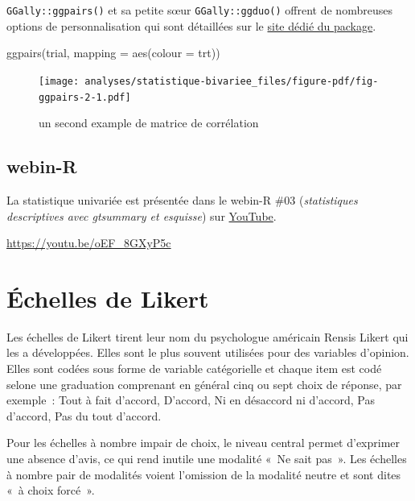 \documentclass[
  letterpaper,
  DIV=11,
  numbers=noendperiod,
  oneside]{scrreprt}
\newenvironment{Shaded}{\begin{snugshade}}{\end{snugshade}}
\newcommand{\AttributeTok}[1]{\textcolor[rgb]{0.40,0.45,0.13}{#1}}
\newcommand{\FunctionTok}[1]{\textcolor[rgb]{0.28,0.35,0.67}{#1}}
\newcommand{\NormalTok}[1]{\textcolor[rgb]{0.00,0.23,0.31}{#1}}
\begin{document}
\texttt{GGally::ggpairs()} et sa petite sœur \texttt{GGally::ggduo()}
offrent de nombreuses options de personnalisation qui sont détaillées
sur le \href{https://ggobi.github.io/ggally/articles/ggpairs.html}{site
dédié du package}.

\begin{Shaded}
\begin{Highlighting}[]
\FunctionTok{ggpairs}\NormalTok{(trial, }\AttributeTok{mapping =} \FunctionTok{aes}\NormalTok{(}\AttributeTok{colour =}\NormalTok{ trt))}
\end{Highlighting}
\end{Shaded}

\begin{figure}[H]

{\centering \texttt{[image: analyses/statistique-bivariee\_files/figure-pdf/fig-ggpairs-2-1.pdf]}

}

\caption{\label{fig-ggpairs-2}un second example de matrice de
corrélation}

\end{figure}

\hypertarget{webin-r-6}{%
\section{webin-R}\label{webin-r-6}}

La statistique univariée est présentée dans le webin-R \#03
(\emph{statistiques descriptives avec gtsummary et esquisse}) sur
\href{https://youtu.be/oEF_8GXyP5c?t=3650}{YouTube}.

\url{https://youtu.be/oEF_8GXyP5c}

\hypertarget{sec-likert}{%
\chapter{Échelles de Likert}\label{sec-likert}}

Les échelles de Likert tirent leur nom du psychologue américain Rensis
Likert qui les a développées. Elles sont le plus souvent utilisées pour
des variables d'opinion. Elles sont codées sous forme de variable
catégorielle et chaque item est codé selone une graduation comprenant en
général cinq ou sept choix de réponse, par exemple~: Tout à fait
d'accord, D'accord, Ni en désaccord ni d'accord, Pas d'accord, Pas du
tout d'accord.

Pour les échelles à nombre impair de choix, le niveau central permet
d'exprimer une absence d'avis, ce qui rend inutile une modalité «~Ne
sait pas~». Les échelles à nombre pair de modalités voient l'omission de
la modalité neutre et sont dites «~à choix forcé~».
\end{document}
